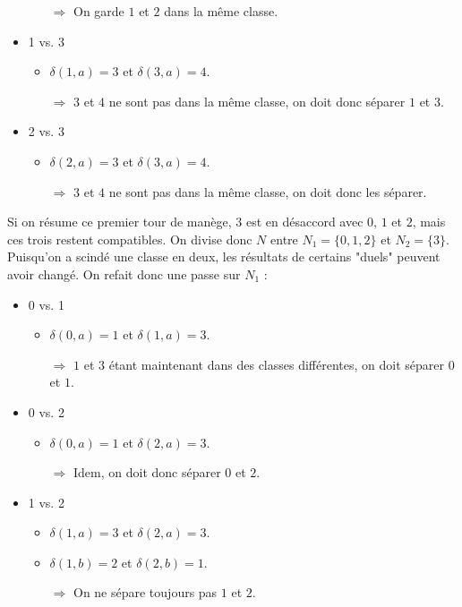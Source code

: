 \begin{example}
\begin{itemize}
\begin{itemize}
\item[$\Rightarrow$] On garde $1$ et $2$ dans la même classe.
\end{itemize}
\item 1 vs. 3
\begin{itemize}
\item $\delta(1,a) = 3$ et $\delta(3,a) = 4$. 
\item[$\Rightarrow$] $3$ et $4$ ne sont pas dans la même classe, on doit donc séparer $1$ et $3$.
\end{itemize}
\item 2 vs. 3
\begin{itemize}
\item $\delta(2,a) = 3$ et $\delta(3,a) = 4$.
\item[$\Rightarrow$] $3$ et $4$ ne sont pas dans la même classe, on doit donc les séparer.
\end{itemize}
\end{itemize}

Si on résume ce premier tour de manège, $3$ est en désaccord avec $0$, $1$ et $2$, mais ces trois restent compatibles. On divise donc $N$ entre $N_1 = \{0,1,2\}$ et $N_2 = \{3\}$. Puisqu'on a scindé une classe en deux, les résultats de certains "duels" peuvent avoir changé. On refait donc une passe sur $N_1$ :

\begin{itemize}
\item 0 vs. 1
\begin{itemize}
\item $\delta(0,a) = 1$ et $\delta(1,a) = 3$. 
\item[$\Rightarrow$] $1$ et $3$ étant maintenant dans des classes différentes, on doit séparer $0$ et $1$.
\end{itemize}
\item 0 vs. 2
\begin{itemize}
\item $\delta(0,a) = 1$ et $\delta(2,a) = 3$. 
\item[$\Rightarrow$] Idem, on doit donc séparer $0$ et $2$.
\end{itemize}
\item 1 vs. 2
\begin{itemize}
\item $\delta(1,a) = 3$ et $\delta(2,a) = 3$. 
\item $\delta(1,b) = 2$ et $\delta(2,b) = 1$. 
\item[$\Rightarrow$] On ne sépare toujours pas $1$ et $2$.
\end{itemize}
\end{itemize}



\end{example}
